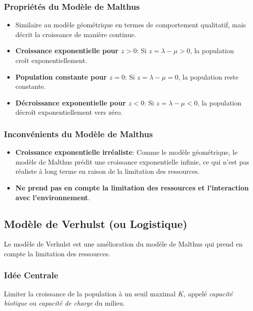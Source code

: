 \documentclass[oneside]{book}
\begin{document}
\subsubsection{Propriétés du Modèle de Malthus}
\begin{itemize}
    \item Similaire au modèle géométrique en termes de comportement qualitatif, mais décrit la croissance de manière continue.
    \item \textbf{Croissance exponentielle pour $z > 0$}: Si $z = \lambda - \mu > 0$, la population croît exponentiellement.
    \item \textbf{Population constante pour $z = 0$}: Si $z = \lambda - \mu = 0$, la population reste constante.
    \item \textbf{Décroissance exponentielle pour $z < 0$}: Si $z = \lambda - \mu < 0$, la population décroît exponentiellement vers zéro.
\end{itemize}

\subsubsection{Inconvénients du Modèle de Malthus}

\begin{itemize}
    \item \textbf{Croissance exponentielle irréaliste}: Comme le modèle géométrique, le modèle de Malthus prédit une croissance exponentielle infinie, ce qui n'est pas réaliste à long terme en raison de la limitation des ressources.
    \item \textbf{Ne prend pas en compte la limitation des ressources et l'interaction avec l'environnement}.
\end{itemize}

\subsection{Modèle de Verhulst (ou Logistique)}

Le modèle de Verhulst est une amélioration du modèle de Malthus qui prend en compte la limitation des ressources.

\subsubsection{Idée Centrale}
\begin{definition}
Limiter la croissance de la population à un seuil maximal $K$, appelé \textit{capacité biotique} ou \textit{capacité de charge} du milieu.
\end{definition}
\end{document}
